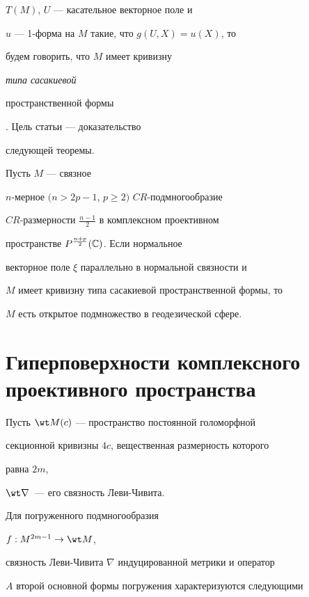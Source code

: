 $T(M)$, $U$ ---  касательное векторное поле и


$u$ --- 1-форма на $M$ такие, что $g(U,X)=u(X)$, то


будем говорить, что  $M$ имеет кривизну {\it типа сасакиевой


пространственной формы}. Цель статьи --- доказательство


следующей теоремы.








\begin{mainthm}


Пусть $M$ --- связное


$n$-мерное $(n>2p-1$, $p\ge 2)$ $CR$-подмногообразие


$CR$-размерности $\frac{n-1}{2}$ в комплексном проективном


пространстве $P^{\frac{n+p}{2}}(\Bbb C)$. Если нормальное


векторное поле $\xi$ параллельно в нормальной связности и


$M$ имеет кривизну типа сасакиевой пространственной формы, то


$M$ есть открытое подмножество в геодезической сфере. 


\end{mainthm}








\section{Гиперповерхности комплексного проективного пространства}








Пусть $\wt M(c)$ --- пространство постоянной голоморфной


секционной кривизны $4c$, вещественная размерность которого


равна $2m$,


$\wt \nabla$~--- его связность Леви-Чивита.


Для погруженного подмногообразия


$f: M^{2m-1}\rightarrow \wt M$,


связность Леви-Чивита $\nabla$ индуцированной метрики и оператор


$A$ второй основной формы погружения характеризуются следующими


